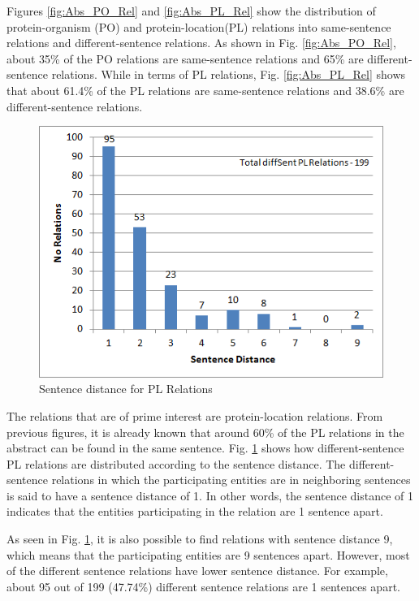 Figures \ref{fig:Abs_PO_Rel} and \ref{fig:Abs_PL_Rel} show the distribution of protein-organism (PO) and protein-location(PL) relations into same-sentence relations and different-sentence relations. As shown in Fig. \ref{fig:Abs_PO_Rel}, about 35\% of the PO relations are same-sentence relations and 65\% are different-sentence relations. While in terms of PL relations, Fig. \ref{fig:Abs_PL_Rel} shows that about 61.4\% of the PL relations are same-sentence relations and 38.6\% are different-sentence relations.

\begin{figure}
\centering
\includegraphics[scale=0.9]{figures/SentenceDistance_PLRel.png}
\caption{Sentence distance for PL Relations}\label{fig:SentDistancePL}
\end{figure}

The relations that are of prime interest are protein-location relations. From previous figures, it is already known that around 60\% of the PL relations in the abstract can be found in the same sentence. Fig. \ref{fig:SentDistancePL} shows how different-sentence PL relations are distributed according to the sentence distance. The different-sentence relations in which the participating entities are in neighboring sentences is said to have a sentence distance of 1. In other words, the sentence distance of 1 indicates that the entities participating in the relation are 1 sentence apart.

As seen in Fig. \ref{fig:SentDistancePL}, it is also possible to find relations with sentence distance 9, which means that the participating entities are 9 sentences apart. However, most of the different sentence relations have lower sentence distance. For example, about 95 out of 199 (47.74\%) different sentence relations are 1 sentences apart.


